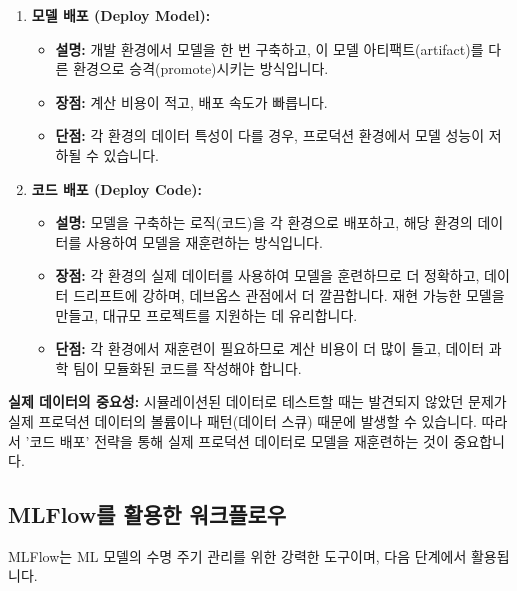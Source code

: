 \documentclass[11pt,a4paper]{article}
\begin{document}
\begin{enumerate}
    \item \textbf{모델 배포 (Deploy Model):}
    \begin{itemize}
        \item \textbf{설명:} 개발 환경에서 모델을 한 번 구축하고, 이 모델 아티팩트(artifact)를 다른 환경으로 승격(promote)시키는 방식입니다.
        \item \textbf{장점:} 계산 비용이 적고, 배포 속도가 빠릅니다.
        \item \textbf{단점:} 각 환경의 데이터 특성이 다를 경우, 프로덕션 환경에서 모델 성능이 저하될 수 있습니다.
    \end{itemize}

    \item \textbf{코드 배포 (Deploy Code):}
    \begin{itemize}
        \item \textbf{설명:} 모델을 구축하는 로직(코드)을 각 환경으로 배포하고, 해당 환경의 데이터를 사용하여 모델을 재훈련하는 방식입니다.
        \item \textbf{장점:} 각 환경의 실제 데이터를 사용하여 모델을 훈련하므로 더 정확하고, 데이터 드리프트에 강하며, 데브옵스 관점에서 더 깔끔합니다. 재현 가능한 모델을 만들고, 대규모 프로젝트를 지원하는 데 유리합니다.
        \item \textbf{단점:} 각 환경에서 재훈련이 필요하므로 계산 비용이 더 많이 들고, 데이터 과학 팀이 모듈화된 코드를 작성해야 합니다.
    \end{itemize}
\end{enumerate}

\begin{warningbox}
\textbf{실제 데이터의 중요성:}
시뮬레이션된 데이터로 테스트할 때는 발견되지 않았던 문제가 실제 프로덕션 데이터의 볼륨이나 패턴(데이터 스큐) 때문에 발생할 수 있습니다. 따라서 '코드 배포' 전략을 통해 실제 프로덕션 데이터로 모델을 재훈련하는 것이 중요합니다.
\end{warningbox}

\subsection{MLFlow를 활용한 워크플로우}

MLFlow는 ML 모델의 수명 주기 관리를 위한 강력한 도구이며, 다음 단계에서 활용됩니다.
\end{document}
